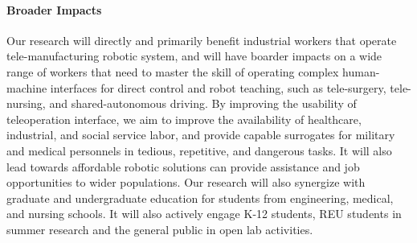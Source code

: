 \vspace{0.5 em}

\paragraph*{\Large Broader Impacts}
Our research will directly and primarily benefit industrial workers that operate tele-manufacturing robotic system, and will have boarder impacts on a wide range of workers that need to master the skill of operating complex human-machine interfaces for direct control and robot teaching, such as tele-surgery, tele-nursing, and shared-autonomous driving. By improving the usability of teleoperation interface, we aim to improve the availability of healthcare, industrial, and social service labor, and provide capable surrogates for military and medical personnels in tedious, repetitive, and dangerous tasks. It will also lead towards affordable robotic solutions can provide assistance and job opportunities to wider populations. Our research will also synergize with graduate and undergraduate education for students from engineering, medical, and nursing schools. It will also actively engage K-12 students, REU students in summer research and the general public in open lab activities. 





  

